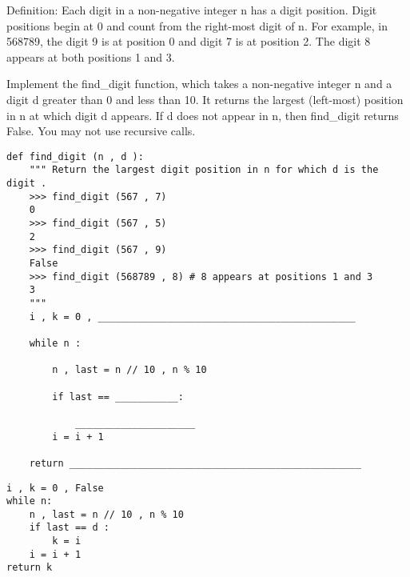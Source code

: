 \begin{blocksection}
\question Definition: Each digit in a non-negative integer n has a digit position. Digit positions begin at 0 and count from the right-most digit of n. For example, in 568789, the digit 9 is at position 0 and digit 7 is at position 2. The digit 8 appears at both positions 1 and 3. 

Implement the find\_digit function, which takes a non-negative integer n and a digit d greater than 0 and less than 10. It returns the largest (left-most) position in n at which digit d appears. If d does not appear in n, then find\_digit returns False. You may not use recursive calls.


\begin{lstlisting}
def find_digit (n , d ): 
    """ Return the largest digit position in n for which d is the digit . 
    >>> find_digit (567 , 7) 
    0 
    >>> find_digit (567 , 5) 
    2 
    >>> find_digit (567 , 9) 
    False 
    >>> find_digit (568789 , 8) # 8 appears at positions 1 and 3 
    3 
    """ 
    i , k = 0 , _____________________________________________
    
    while n : 
    
        n , last = n // 10 , n % 10 

        if last == ___________:

            _____________________
        i = i + 1 

    return ___________________________________________________

\end{lstlisting}
\begin{solution}[1.5in]
\begin{lstlisting}
i , k = 0 , False
while n:
    n , last = n // 10 , n % 10
    if last == d :
        k = i
    i = i + 1
return k
\end{lstlisting}
\end{solution}
\end{blocksection}
